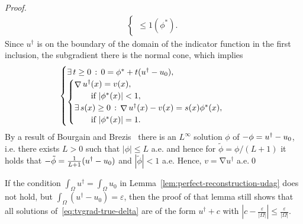 \documentclass[twocolumn,envcountsame]{svjour3}
\newcommand{\abs}[1]{|#1|}
\newcommand{\udag}{u^{\dagger}}
\let\div\relax
\DeclareMathOperator{\grad}{\nabla}
\DeclareMathOperator{\div}{div}
\begin{document}
\begin{proof}
\begin{align*}
\begin{cases}
{        \leq 1}(\phi^*).
    \end{cases}
  \end{align*}
  Since $\udag$ is on the boundary of the domain of the indicator function in the first inclusion, the subgradient there is the normal cone, which implies
  \begin{align*}
    &\begin{cases}
      \exists\, t\geq 0\,:\, 0 = \div\phi^* + t(\udag - u_0),\\
      \begin{cases}
        \grad \udag (x) = v(x),\\
        \qquad\text{if}\ \abs{\phi^*(x)} < 1,\\
        \exists\, s(x) \geq 0\,:\, \grad \udag(x) - v(x) = 
        s(x)\phi^*(x), \\
        \qquad\text{if}\ \abs{\phi^*(x)} = 1.
      \end{cases}
    \end{cases}
  \end{align*}
  By a result of Bourgain and Brezis~\cite[Proposition 1]{bourgain2003divYf} there is an $L^{\infty}$ solution $\phi$ of $-\div\phi = \udag - u_0$, i.e. there exists $L>0$ such that $\abs{\phi}\leq L$ a.e. and hence for $\tilde{\phi} = \phi/(L+1)$ it holds that $-\div
  \tilde{\phi} = \tfrac1{L+1}(\udag - u_0)$ and  $\abs{\tilde\phi}
  < 1$ a.e. Hence, $v = \grad \udag$ a.e.\hfill\qed
\end{proof}

\begin{remark}
  If the condition $\int_{\Omega}\udag = \int_{\Omega}u_{0}$ in Lemma~\ref{lem:perfect-reconstruction-udag} does not hold, but $\int_{\Omega}(\udag-u_{0}) = \varepsilon$,
  then the proof of that lemma still shows that all solutions of~\eqref{eq:tvgrad-true-delta} are of the form $\udag + c$ with $\abs{c-\tfrac{\varepsilon}{\abs{\Omega}}}\leq \tfrac{\varepsilon}{\abs{\Omega}}$.
\end{remark}
\end{document}
